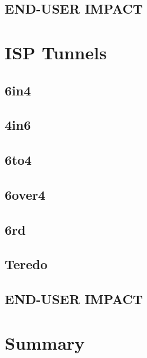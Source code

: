 \documentclass[format=sigconf, natbib=true, nonacm=true]{acmart}
\begin{document}
    \subsection*{END-USER IMPACT}
    \lipsum[18-21]

    \section{ISP Tunnels}
    \lipsum[21]
    \subsection{6in4}
    \lipsum[22-24]
    \subsection{4in6}
    \lipsum[24-26]
    \subsection{6to4}
    \lipsum[26-28]
    \subsection*{6over4}
    \lipsum[18-21]
    \subsection{6rd}
    \lipsum[26-28]
    \subsection*{Teredo}
    \lipsum[18-21]
    \subsection*{END-USER IMPACT}
    \lipsum[18-22]

    \section{Summary}
    \lipsum[100-104]

    
    
\end{document}
